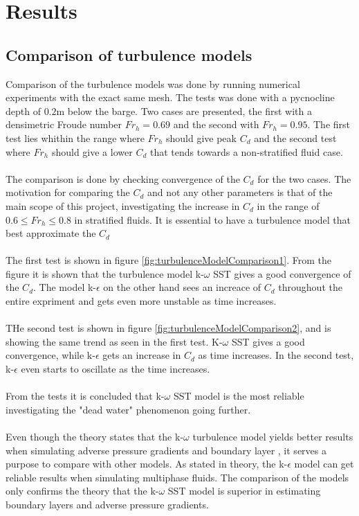 \documentclass[a4paper, 12pt]{report}
\begin{document}
\chapter{Results}
\section{Comparison of turbulence models}
Comparison of the turbulence models was done by running numerical experiments with the exact same mesh. The tests was done with a pycnocline depth of $0.2$m below the barge. Two cases are presented, the first with a densimetric Froude number $Fr_h=0.69$ and the second with $Fr_h=0.95$. The first test lies whithin the range where $Fr_h$ should give peak $C_d$ and the second test where $Fr_h$ should give a lower $C_d$ that tends towards a non-stratified fluid case.\\
\\
The comparison is done by checking convergence of the $C_d$ for the two cases. The motivation for comparing the $C_d$ and not any other parameters is that of the main scope of this project, investigating the increase in $C_d$ in the range of $0.6\leq Fr_h \leq 0.8$ in stratified fluids. It is essential to have a turbulence model that best approximate the $C_d$ \\
\\
The first test is shown in figure \ref{fig:turbulenceModelComparison1}. From the figure it is shown that the turbulence model k-$\omega$ SST gives a good convergence of the $C_d$. The model k-$\epsilon$ on the other hand sees an increace of $C_d$ throughout the entire expriment and gets even more unstable as time increases.\\
\\
THe second test is shown in figure \ref{fig:turbulenceModelComparison2}, and is showing the same trend as seen in the first test. K-$\omega$ SST gives a good convergence, while k-$\epsilon$ gets an increase in $C_d$ as time increases. In the second test, k-$\epsilon$ even starts to oscillate as the time increases.\\
\\
From the tests it is concluded that k-$\omega$ SST model is the most reliable investigating the "dead water" phenomenon going further.\\
\\
Even though the theory states that the k-$\omega$ turbulence model yields better results when simulating adverse pressure gradients and boundary layer \cite{CFD}, it serves a purpose to compare with other models. As stated in theory, the k-$\epsilon$ model can get reliable results when simulating multiphase fluids. The comparison of the models only confirms the theory that the k-$\omega$ SST model is superior in estimating boundary layers and adverse pressure gradients.\\
\end{document}
